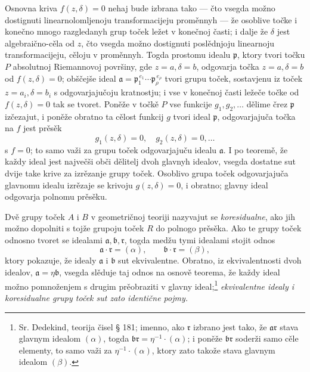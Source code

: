\documentclass[11pt]{article}
\providecommand{\fra}{\mathfrak a}
\providecommand{\frb}{\mathfrak b}
\providecommand{\frp}{\mathfrak p}
\providecommand{\frr}{\mathfrak r}
\begin{document}
Osnovna kriva \(f(z,\delta)=0\) nehaj bude izbrana tako --- čto vsegda možno dostignuti linearnolomljenoju transformacijeju proměnnyh --- že osoblive točke i konečno mnogo razgledanyh grup toček ležet v konečnoj časti; i dalje že \(\delta\) jest algebraično-cěla od \(z\), čto vsegda možno dostignuti poslědnjoju linearnoju transformacijeju, cěloju v proměnnyh. Togda prostomu idealu \(\frp\), ktory tvori točku \(P\) absolutnoj Riemannovoj površiny, gde \(z=a,\delta=b\), odgovarja točka \(z=a,\delta=b\) od \(f(z,\delta)=0\); obščejše ideal \(\fra=\frp_1^{\,e_1}\cdots\frp_\rho^{\,e_\rho}\) tvori grupu toček, sostavjenu iz toček \(z=a_i,\delta=b_i\) s odgovarjajučoju kratnostju; i vse v konečnoj časti ležeče točke od \(f(z,\delta)=0\) tak se tvoret. Poněže v točkě \(P\) vse funkcije \(g_1,g_2,\ldots\) dělime črez \(\frp\) izčezajut, i poněže obratno ta cělost funkcij \(g\) tvori ideal \(\frp\), odgovarjajuča točka na \(f\) jest prěsěk
\[
g_1(z,\delta)=0,\quad g_2(z,\delta)=0,\ldots
\]
s \(f=0\); to samo važi za grupu toček odgovarjajuču idealu \(\fra\). I po teoremě, že každy ideal jest največši obči dělitelj dvoh glavnyh idealov, vsegda dostatne sut dvije take krive za izrězanje grupy toček. Osoblivo grupa toček odgovarjajuča glavnomu idealu izrězaje se krivoju \(g(z,\delta)=0\), i obratno; glavny ideal odgovarja polnomu prěsěku.

Dvě grupy toček \(A\) i \(B\) v geometričnoj teoriji nazyvajut se {\itshape koresidualne}, ako jih možno dopolniti s tojže grupoju toček \(R\) do polnogo prěsěka. Ako te grupy toček odnosno tvoret se idealami \(\fra,\frb,\frr\), togda medžu tymi idealami stojit odnos
\[
\fra\cdot\frr=(\alpha),\qquad \frb\cdot\frr=(\beta),
\]
ktory pokazuje, že idealy \(\fra\) i \(\frb\) sut ekvivalentne. Obratno, iz ekvivalentnosti dvoh idealov, \(\fra=\eta\frb\), vsegda slěduje taj odnos na osnově teorema, že každy ideal možno pomnoženjem s drugim prěobraziti v glavny ideal;\footnote{Sr. Dedekind, teorija čisel § 181; imenno, ako \(\frr\) izbrano jest tako, že \(\fra\frr\) stava glavnym idealom \((\alpha)\), togda \(\frb\frr=\eta^{-1}\cdot(\alpha)\); i poněže \(\frb\frr\) soderži samo cěle elementy, to samo važi za \(\eta^{-1}\cdot(\alpha)\), ktory zato takože stava glavnym idealom \((\beta)\).} {\itshape ekvivalentne idealy i koresidualne grupy toček sut zato identične pojmy.}
\end{document}
